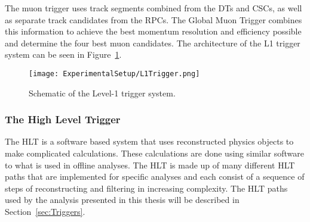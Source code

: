 The muon trigger uses track segments combined from the DTs and CSCs, as well as separate track candidates from the RPCs. The Global Muon Trigger combines this information to achieve the best momentum resolution and efficiency possible and determine the four best muon candidates. The architecture of the L1 trigger system can be seen in Figure~\ref{fig:L1Trigger}.

\begin{figure}[h!]
\begin{center}
\texttt{[image: ExperimentalSetup/L1Trigger.png]}
\end{center}
\caption{Schematic of the Level-1 trigger system.}
\label{fig:L1Trigger}
\end{figure}

\subsubsection{The High Level Trigger}

The HLT is a software based system that uses reconstructed physics objects to make complicated calculations. These calculations are done using similar software to what is used in offline analyses. The HLT is made up of many different HLT paths that are implemented for specific analyses and each consist of a sequence of steps of reconstructing and filtering in increasing complexity. The HLT paths used by the analysis presented in this thesis will be described in Section~\ref{sec:Triggers}.


